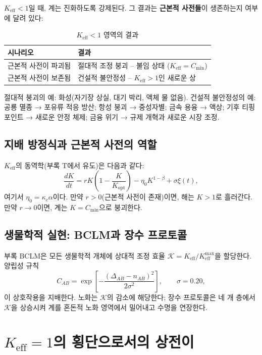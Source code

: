\documentclass[12pt,a4paper]{article}
\newcommand{\Keff}{K_{\mathrm{eff}}}
\newcommand{\REL}{\mathcal{K}}
\begin{document}
	\(\Keff < 1\)일 때, 계는 진화하도록 강제된다. 그 결과는 \textbf{근본적 사전들}이 생존하는지 여부에 달려 있다:
	
	\begin{table}[H]
		\centering
		\caption{\(\Keff < 1\) 영역의 결과}
		\begin{tabular}{p{5cm}p{8cm}}
			\toprule
			\textbf{시나리오} & \textbf{결과} \\
			\midrule
			근본적 사전이 파괴됨 & 절대적 조정 붕괴 – 불임 상태 (\(\Keff = C_{\min}\)) \\
			근본적 사전이 보존됨 & 건설적 불안정성 – \(\Keff > 1\)인 새로운 상 \\
			\bottomrule
		\end{tabular}
	\end{table}
	
	절대적 붕괴의 예: 화성(자기장 상실, 대기 박리, 액체 물 없음).
	건설적 불안정성의 예: 공룡 멸종 → 포유류 적응 방산; 항성 붕괴 → 중성자별; 금속 용융 → 액상; 기후 티핑 포인트 → 새로운 안정 체제; 금융 위기 → 규제 개혁과 새로운 시장 조정.
	
	\subsection{지배 방정식과 근본적 사전의 역할}
	
	\(\Keff\)의 동역학(부록 T에서 유도)은 다음과 같다:
	\begin{equation}
		\frac{dK}{dt} = r K\left(1 - \frac{K}{K_{\mathrm{opt}}}\right) - \eta_0 K^{1-\beta} + \sigma \xi(t),
		\label{eq:master}
	\end{equation}
	여기서 \(\eta_0 = \kappa_c \alpha\)이다. 만약 \(r > 0\)(근본적 사전이 존재)이면, 해는 \(K > 1\)로 흘러간다. 만약 \(r \to 0\)이면, 계는 \(K = C_{\min}\)으로 붕괴한다.
	
	\subsection{생물학적 실현: BCLM과 장수 프로토콜}
	
	부록 BCLM은 모든 생물학적 개체에 상대적 조정 효율 \(\REL = \Keff/\Keff^{\max}\)을 할당한다. 양립성 규칙
	\[
	C_{AB} = \exp\!\left[-\frac{(\Delta_{AB} - n_{AB})^2}{2\sigma^2}\right],\qquad \sigma = 0.20,
	\]
	이 상호작용을 지배한다. 노화는 \(\REL\)의 감소에 해당한다; 장수 프로토콜은 네 개 층에서 \(\REL\)을 상승시켜 계를 혼돈적 노화 영역에서 밀어내고 수명을 연장한다.
	
	\section{\(\Keff = 1\)의 횡단으로서의 상전이}
	
\end{document}

